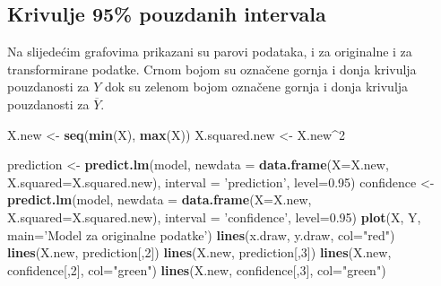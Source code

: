 \documentclass[]{article}
\newenvironment{Shaded}{\begin{snugshade}}{\end{snugshade}}
\newcommand{\KeywordTok}[1]{\textcolor[rgb]{0.13,0.29,0.53}{\textbf{{#1}}}}
\newcommand{\DataTypeTok}[1]{\textcolor[rgb]{0.13,0.29,0.53}{{#1}}}
\newcommand{\DecValTok}[1]{\textcolor[rgb]{0.00,0.00,0.81}{{#1}}}
\newcommand{\FloatTok}[1]{\textcolor[rgb]{0.00,0.00,0.81}{{#1}}}
\newcommand{\StringTok}[1]{\textcolor[rgb]{0.31,0.60,0.02}{{#1}}}
\newcommand{\NormalTok}[1]{{#1}}
\begin{document}
\subsection{Krivulje 95\% pouzdanih
intervala}\label{krivulje-95-pouzdanih-intervala}

Na slijedećim grafovima prikazani su parovi podataka, i za originalne i
za transformirane podatke. Crnom bojom su označene gornja i donja
krivulja pouzdanosti za \(Y\) dok su zelenom bojom označene gornja i
donja krivulja pouzdanosti za \(\overline{Y}\).

\begin{Shaded}
\begin{Highlighting}[]
\NormalTok{X.new <-}\StringTok{ }\KeywordTok{seq}\NormalTok{(}\KeywordTok{min}\NormalTok{(X), }\KeywordTok{max}\NormalTok{(X))}
\NormalTok{X.squared.new <-}\StringTok{ }\NormalTok{X.new^}\DecValTok{2}

\NormalTok{prediction <-}\StringTok{ }\KeywordTok{predict.lm}\NormalTok{(model, }\DataTypeTok{newdata =} \KeywordTok{data.frame}\NormalTok{(}\DataTypeTok{X=}\NormalTok{X.new, }\DataTypeTok{X.squared=}\NormalTok{X.squared.new),}
                         \DataTypeTok{interval =} \StringTok{'prediction'}\NormalTok{, }\DataTypeTok{level=}\FloatTok{0.95}\NormalTok{)}
\NormalTok{confidence <-}\StringTok{ }\KeywordTok{predict.lm}\NormalTok{(model, }\DataTypeTok{newdata =} \KeywordTok{data.frame}\NormalTok{(}\DataTypeTok{X=}\NormalTok{X.new, }\DataTypeTok{X.squared=}\NormalTok{X.squared.new),}
                         \DataTypeTok{interval =} \StringTok{'confidence'}\NormalTok{, }\DataTypeTok{level=}\FloatTok{0.95}\NormalTok{)}
\KeywordTok{plot}\NormalTok{(X, Y, }\DataTypeTok{main=}\StringTok{'Model za originalne podatke'}\NormalTok{)}
\KeywordTok{lines}\NormalTok{(x.draw, y.draw, }\DataTypeTok{col=}\StringTok{"red"}\NormalTok{)}
\KeywordTok{lines}\NormalTok{(X.new, prediction[,}\DecValTok{2}\NormalTok{])}
\KeywordTok{lines}\NormalTok{(X.new, prediction[,}\DecValTok{3}\NormalTok{])}
\KeywordTok{lines}\NormalTok{(X.new, confidence[,}\DecValTok{2}\NormalTok{], }\DataTypeTok{col=}\StringTok{"green"}\NormalTok{)}
\KeywordTok{lines}\NormalTok{(X.new, confidence[,}\DecValTok{3}\NormalTok{], }\DataTypeTok{col=}\StringTok{"green"}\NormalTok{)}
\end{Highlighting}
\end{Shaded}
\end{document}
